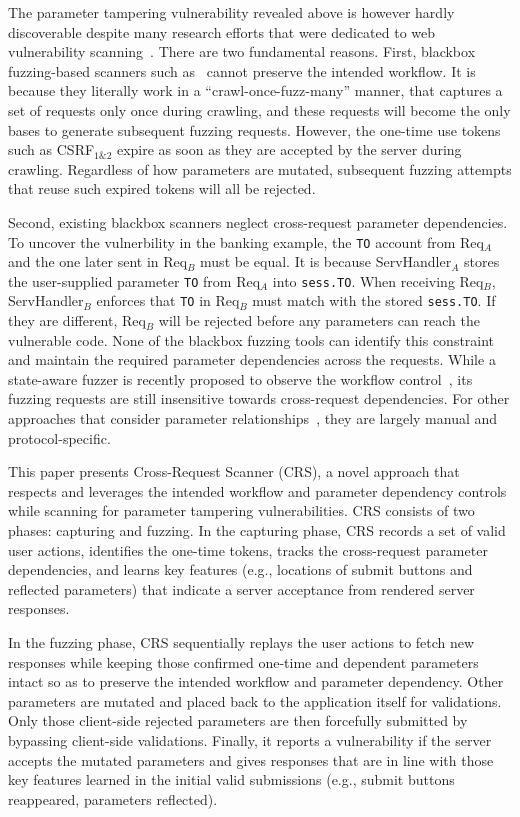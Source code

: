 \documentclass[letter]{sig-alternate-2013}
\begin{document}
The parameter tampering vulnerability revealed above is however hardly discoverable despite many research efforts that were dedicated to web vulnerability scanning~\cite{waptec,notamper,state-aware,swift,ripley,kudzu,logicvul,parampollution}. There are two fundamental reasons. First, blackbox fuzzing-based scanners such as~\cite{notamper,acunetix,webscarab,tamperdata} cannot preserve the intended workflow. It is because they literally work in a ``crawl-once-fuzz-many'' manner, that captures a set of requests only once during crawling, and these requests will become the only bases to generate subsequent fuzzing requests. However, the one-time use tokens such as CSRF$_{1\&2}$ expire as soon as they are accepted by the server during crawling. Regardless of how parameters are mutated, subsequent fuzzing attempts that reuse such expired tokens will all be rejected.

Second, existing blackbox scanners neglect cross-request parameter dependencies. To uncover the vulnerbility in the banking example, the \verb"TO" account from Req$_A$ and the one later sent in Req$_B$ must be equal. It is because ServHandler$_A$ stores the user-supplied parameter \verb"TO" from Req$_A$ into \verb"sess.TO". When receiving Req$_B$, ServHandler$_B$ enforces that \verb"TO" in Req$_B$ must match with the stored \verb"sess.TO". If they are different, Req$_B$ will be rejected before any parameters can reach the vulnerable code. None of the blackbox fuzzing tools can identify this constraint and maintain the required parameter dependencies across the requests. While a state-aware fuzzer is recently proposed to observe the workflow control~\cite{state-aware}, its fuzzing requests are still insensitive towards cross-request dependencies. For other approaches that consider parameter relationships~\cite{sso,shop-for-free}, they are largely manual and protocol-specific. 



This paper presents Cross-Request Scanner (CRS), a novel approach that respects and leverages the intended workflow and parameter dependency controls while scanning for parameter tampering vulnerabilities. CRS consists of two phases: capturing and fuzzing. In the capturing phase, CRS records a set of valid user actions, identifies the one-time tokens, tracks the cross-request parameter dependencies, and learns key features (e.g., locations of submit buttons and reflected parameters) that indicate a server acceptance from rendered server responses. 


In the fuzzing phase, CRS sequentially replays the user actions to fetch new responses while keeping those confirmed one-time and dependent parameters intact so as to preserve the intended workflow and parameter dependency. Other parameters are mutated and placed back to the application itself for validations. Only those client-side rejected parameters are then forcefully submitted by bypassing client-side validations. Finally, it reports a vulnerability if the server accepts the mutated parameters and gives responses that are in line with those key features learned in the initial valid submissions (e.g., submit buttons reappeared, parameters reflected).
\end{document}
